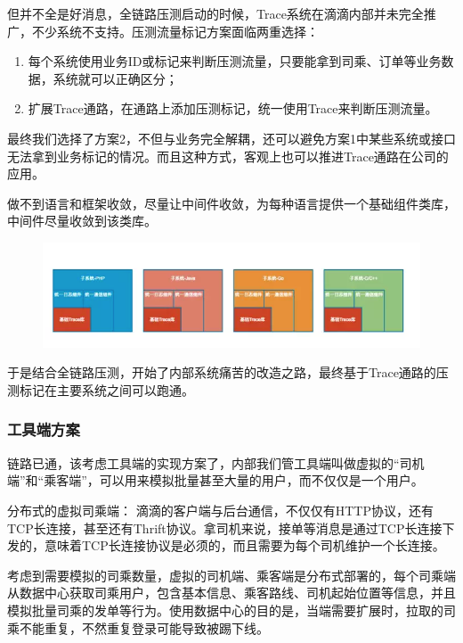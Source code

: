 \documentclass[12pt]{article}
\begin{document}
但并不全是好消息，全链路压测启动的时候，Trace系统在滴滴内部并未完全推广，不少系统不支持。压测流量标记方案面临两重选择：
\begin{enumerate}
\setlength{\itemsep}{0pt}
\setlength{\parsep}{0pt}
\setlength{\parskip}{0pt}
    \item 每个系统使用业务ID或标记来判断压测流量，只要能拿到司乘、订单等业务数据，系统就可以正确区分；
    \item 扩展Trace通路，在通路上添加压测标记，统一使用Trace来判断压测流量。
\end{enumerate}

最终我们选择了方案2，不但与业务完全解耦，还可以避免方案1中某些系统或接口无法拿到业务标记的情况。而且这种方式，客观上也可以推进Trace通路在公司的应用。

做不到语言和框架收敛，尽量让中间件收敛，为每种语言提供一个基础组件类库，中间件尽量收敛到该类库。
\begin{figure}[H]
    \centering
    \includegraphics[width=1\textwidth]{fig/DIDI_Pressure_6.png}
\end{figure}
于是结合全链路压测，开始了内部系统痛苦的改造之路，最终基于Trace通路的压测标记在主要系统之间可以跑通。

\subsubsection{工具端方案}
链路已通，该考虑工具端的实现方案了，内部我们管工具端叫做虚拟的“司机端”和“乘客端”，可以用来模拟批量甚至大量的用户，而不仅仅是一个用户。

分布式的虚拟司乘端： 滴滴的客户端与后台通信，不仅仅有HTTP协议，还有TCP长连接，甚至还有Thrift协议。拿司机来说，接单等消息是通过TCP长连接下发的，意味着TCP长连接协议是必须的，而且需要为每个司机维护一个长连接。

考虑到需要模拟的司乘数量，虚拟的司机端、乘客端是分布式部署的，每个司乘端从数据中心获取司乘用户，包含基本信息、乘客路线、司机起始位置等信息，并且模拟批量司乘的发单等行为。使用数据中心的目的是，当端需要扩展时，拉取的司乘不能重复，不然重复登录可能导致被踢下线。
\end{document}
